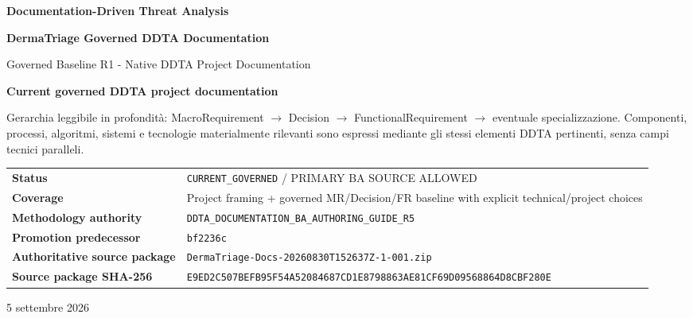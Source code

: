 \documentclass[11pt,a4paper]{article}
\begin{document}
\renewcommand{\candidateauthority}{\texttt{CURRENT\_GOVERNED}}

\begin{titlepage}
\thispagestyle{empty}
\vspace*{9mm}
{\sffamily\bfseries\color{DDTANavy}\fontsize{15}{18}\selectfont Documentation-Driven Threat Analysis}\par
\vspace{5mm}
{\sffamily\bfseries\color{DDTANavy}\fontsize{28}{32}\selectfont DermaTriage Governed DDTA Documentation}\par
\vspace{2mm}
{\sffamily\color{DDTABlue}\fontsize{18}{22}\selectfont Governed Baseline R1 - Native DDTA Project Documentation}\par

\vspace{10mm}
\begin{tcolorbox}[enhanced,arc=3pt,boxrule=0pt,colback=DDTANavy,left=12pt,right=12pt,top=10pt,bottom=10pt]
{\color{white}\sffamily\bfseries Current governed DDTA project documentation}\par
\vspace{2mm}
{\color{white!88}\small Gerarchia leggibile in profondità: MacroRequirement $\rightarrow$ Decision $\rightarrow$ FunctionalRequirement $\rightarrow$ eventuale specializzazione. Componenti, processi, algoritmi, sistemi e tecnologie materialmente rilevanti sono espressi mediante gli stessi elementi DDTA pertinenti, senza campi tecnici paralleli.}
\end{tcolorbox}

\vspace{8mm}
\begin{tabularx}{\textwidth}{L{46mm}Y}
\toprule
\textbf{Status} & \texttt{CURRENT\_GOVERNED} / PRIMARY BA SOURCE ALLOWED \\
\textbf{Coverage} & Project framing + governed MR/Decision/FR baseline with explicit technical/project choices \\
\textbf{Methodology authority} & \texttt{DDTA\_DOCUMENTATION\_BA\_AUTHORING\_GUIDE\_R5} \\
\textbf{Promotion predecessor} & \texttt{bf2236c} \\
\textbf{Authoritative source package} & \texttt{DermaTriage-Docs-20260830T152637Z-1-001.zip} \\
\textbf{Source package SHA-256} & {\scriptsize\nolinkurl{E9ED2C507BEFB95F54A52084687CD1E8798863AE81CF69D09568864D8CBF280E}} \\
\bottomrule
\end{tabularx}

\vfill
{\sffamily\small\color{DDTAGray}5 settembre 2026}
\end{titlepage}
\end{document}
